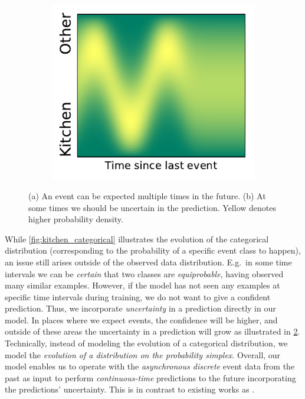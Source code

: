 \begin{figure}
\begin{subfigure}{.5 \linewidth}
        \end{subfigure}
        \begin{subfigure}{.4 \linewidth}
                \centering
                \includegraphics[width=\linewidth]{sections/010_neurips2019/paper/images/dirichlet_evolution.pdf}
                \vspace*{-0.6cm}
                \caption{}
                \label{fig:kitchen_uncertainty}
        \end{subfigure}
        \caption{(a) An event can be expected multiple times in the future. (b) At some times we should be uncertain in the prediction. Yellow denotes higher probability density.}
\end{figure}
While \cref{fig:kitchen_categorical} illustrates the evolution of the categorical distribution (corresponding to the probability of a specific event class to happen), an issue still arises outside of the observed data distribution. {E.g.\ in some time intervals we can be \textit{certain} that two classes are \textit{equiprobable}, having observed many similar examples. However,} if the model has not seen any examples at specific time intervals during training, we do not want to give a confident prediction. Thus, we incorporate \textit{uncertainty} in a prediction directly in our model. In places where we expect events, the confidence will be higher, and outside of these areas the uncertainty in a prediction will grow as illustrated in \cref{fig:kitchen_uncertainty}. Technically, instead of modeling the evolution of a categorical distribution, we model the \textit{evolution of a distribution on the probability simplex}.
%
Overall, our model enables us to operate with the \textit{asynchronous discrete} event data from the past as input to perform \textit{continuous-time} predictions to the future incorporating the predictions' uncertainty. This is in contrast to existing works as \cite{RMTPP, hawkes}.
